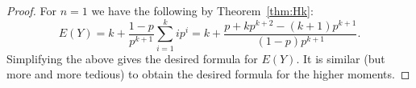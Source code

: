 \documentclass[10pt]{amsart}
\theoremstyle{definition}
\theoremstyle{remark}
\begin{document}
\begin{proof}
For $n=1$ we have the following by Theorem~\ref{thm:Hk}:
\[
E(Y) %
= k + \frac{1-p}{p^{k+1}} \sum_{i=1}^k ip^i 
= k + \frac{p +k p^{k+2} - (k+1) p^{k+1}}{(1-p)p^{k+1}}.
\]
Simplifying the above gives the desired formula for $E(Y)$.
It is similar (but more and more tedious) to obtain the desired formula for the higher moments.
\end{proof}
\end{document}
